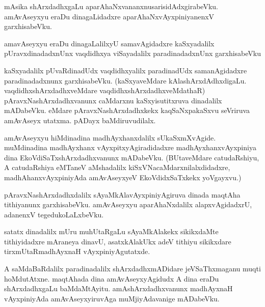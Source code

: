 \documentclass{article}
\begin{document}
\begin{mn}
mAsika shArxdadhxgaLu  aparAhaNxvananxnusarisidAdxgirabeVku.  amAvAseyxyu  eraDu  dinagaLidadxre  aparAhaNxvAyxpiniyanenxV  garxhisabeVku.
\end{mn}

\begin{mn}
amavAseyxyu  eraDu  dinagaLalilxyU  samavAgidadxre  kaSxyadalilx  pUravxdinadadxnUnx  vaqdidhxya  viSayadalilx  paradinadadxnUnx  garxhisabeVku
\end{mn}

\begin{mn}
kaSxyadalilx  pUvaRdinadUdx  vaqdidhxyalilx  paradinadUdx  samanAgidadxre  paradinadadxnunx  garxhisabeVku.  (kaSxyaveMdare  kAlashArxdAdhxdigaLu.  
vaqdidhxshArxdadhxveMdare  vaqdidhxshArxdadhxveMdathaR)   pAravxNashArxdadhxvanunx  caMdarxnu  kaSxyisutitxruva  dinadalilx  mADabeVku.  eMdare  
pAravxNashArxdadhxkekx  kaqSaNxpakaSxvu  seVriruva  amAvAseyx  utatxma.  pADayx  baMdiruvudilalx.
\end{mn}

\begin{mn}
amAvAseyxyu  hiMdinadina  madhAyxhanxdalilx  sUkaSxmXvAgide.  muMdinadina  madhAyxhanx  vAyxpitxyAgiradidadxre  madhAyxhanxvAyxpiniya  
dina  EkoVdiSaTxshArxdadhxvanunx  mADabeVku.  (BUtaveMdare  catudaRshiyu,  A  catudaRshiya  eMTaneV  aMshadalilx  kiSxVNacaMdarxnilalxdidadxre,  
madhAhanxvAyxpiniyAda  amAvAseyxyeV  EkoVdidxSaTxkekx  yoVgayxvu.)
\end{mn}

\begin{mn}
pAravxNashArxdadhxdalilx  sAyaMkAlavAyxpiniyAgiruva  dinada  maqtAha  tithiyanunx  garxhisabeVku.  amAvAseyxyu  aparAhaNxdalilx  
alapxvAgidadxrU,  adanenxV  tegedukoLaLxbeVku.
\end{mn}

\begin{mn}
satatx  dinadalilx  mUru  muhUtaRgaLu  sAyaMkAlakekx  sikikxdaMte  tithiyidadxre  mAraneya  dinavU,  asatxkAlakUkx  adeV  tithiyu  
sikikxdare  tirxmUtaRmadhAyxnaH vAyxpiniyAgutatxde.
\end{mn}

\begin{mn}
A  saMdaBaRdalilx  paradinadalilx  shArxdadhxmADidare  jeVSaThxmaganu  muqti hoMdutAtxne.  maqtAhada  dina  amAvAseyxyAgidudx  A  dina  
eraDu  shArxdadhxgaLu  baMdaMtAyitu.  amAshArxdadhxvanunx  madhAyxnaH vAyxpiniyAda  amAvAseyxyiruvAga  muMjiyAdavanige  mADabeVku.
\end{mn}
\end{document}
